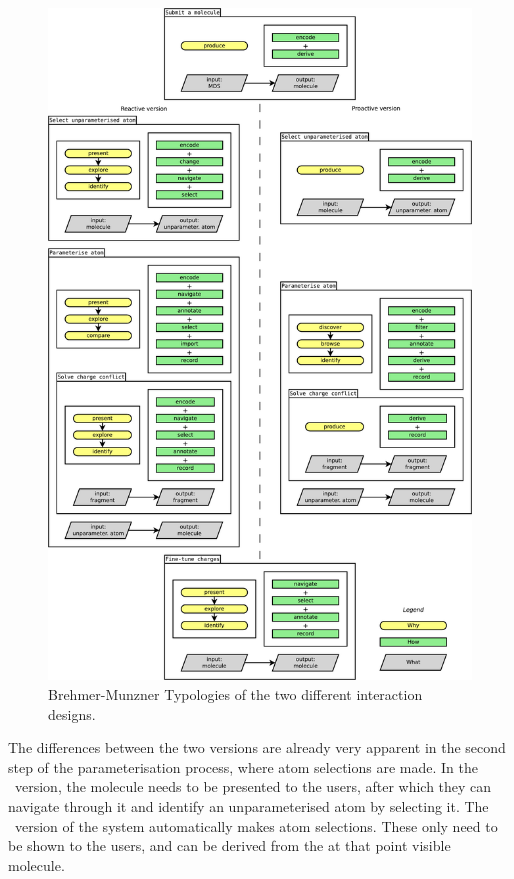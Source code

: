 \begin{figure}[h!]
\begin{center}
\includegraphics[width=\textwidth]{img/complete_typology.pdf}
\caption{Brehmer-Munzner Typologies of the two different interaction designs.}
\vspace{-2cm}
\end{center}
\end{figure}

The differences between the two versions are already very apparent in the second step of the parameterisation process, where atom selections are made. In the \IDa\ version, the molecule needs to be presented to the users, after which they can navigate through it and identify an unparameterised atom by selecting it. The \IDb\ version of the system automatically makes atom selections. These only need to be shown to the users, and can be derived from the at that point visible molecule.

